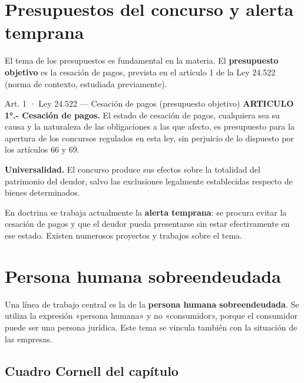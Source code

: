 \documentclass[12pt,oneside]{book}
\begin{document}
\section{Presupuestos del concurso y alerta temprana}

El tema de los presupuestos es fundamental en la materia. El \textbf{presupuesto objetivo} es la cesación de pagos, prevista en el artículo 1 de la Ley 24.522 (norma de contexto, estudiada previamente).

\begin{norma}{Art. 1 · Ley 24.522 — Cesación de pagos (presupuesto objetivo)}
\textbf{ARTICULO 1°.- Cesación de pagos.} El estado de cesación de pagos, cualquiera sea su causa y la naturaleza de las obligaciones a las que afecto, es presupuesto para la apertura de los concursos regulados en esta ley, sin perjuicio de lo dispuesto por los artículos 66 y 69.

\textbf{Universalidad.} El concurso produce sus efectos sobre la totalidad del patrimonio del deudor, salvo las exclusiones legalmente establecidas respecto de bienes determinados.
\end{norma}

En doctrina se trabaja actualmente la \textbf{alerta temprana}: se procura evitar la cesación de pagos y que el deudor pueda presentarse sin estar efectivamente en ese estado. Existen numerosos proyectos y trabajos sobre el tema.

\section{Persona humana sobreendeudada}

Una línea de trabajo central es la de la \textbf{persona humana sobreendeudada}. Se utiliza la expresión «persona humana» y no «consumidor», porque el consumidor puede ser una persona jurídica. Este tema se vincula también con la situación de las empresas.

\subsection*{Cuadro Cornell del capítulo}
\end{document}
